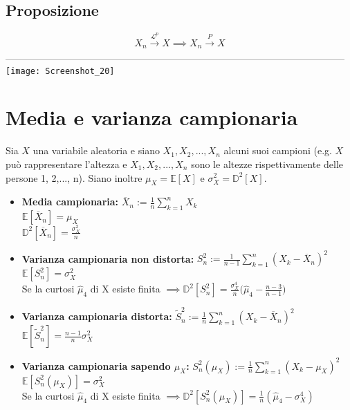 \documentclass{article}
\begin{document}
\subsection*{Proposizione}
\[ X_{n} \xrightarrow[]{\mathcal{L}^{p}}X \implies X_{n} \xrightarrow[]{P}X \]
---------------------------------------------------------------------------------------------------------\\
\texttt{[image: Screenshot\_20]}

\section*{Media e varianza campionaria}
Sia $X$ una variabile aleatoria e siano $X_{1}, X_{2},...,X_{n}$ alcuni suoi campioni (e.g. $X$ può rappresentare l'altezza e $X_{1}, X_{2},...,X_{n}$ sono le altezze rispettivamente delle persone 1, 2,..., n). Siano inoltre $\mu_{X} = \mathbb{E}[X]$ e $\sigma_{X}^{2} = \mathbb{D}^{2}[X]$.
\begin{itemize}
\item \textbf{Media campionaria:} $\overline{X}_{n} := \frac{1}{n} \sum_{k=1}^{n}X_{k}$\\
$\mathbb{E}[\overline{X}_{n}] = \mu_{X}$\\
$\mathbb{D}^{2}[\overline{X}_{n}] = \frac{\sigma_{X}^{2}}{n}$
\item \textbf{Varianza campionaria non distorta:} $S_{n}^{2} := \frac{1}{n-1} \sum_{k=1}^{n}(X_{k} - \overline{X}_{n})^{2}$\\
$\mathbb{E}[S_{n}^{2}] = \sigma_{X}^{2}$\\
Se la curtosi $\hat{\mu}_{4}$ di X esiste finita $\implies \mathbb{D}^{2}[S_{n}^{2}] = \frac{\sigma_{X}^{4}}{n}\Big(\hat{\mu}_{4}-\frac{n-3}{n-1}\Big)$
\item \textbf{Varianza campionaria distorta:} $\widetilde{S}_{n}^{2} := \frac{1}{n} \sum_{k=1}^{n}(X_{k} - \overline{X}_{n})^{2}$\\
$\mathbb{E}[\widetilde{S}_{n}^{2}] = \frac{n-1}{n} \sigma_{X}^{2}$
\item \textbf{Varianza campionaria sapendo $\mu_{X}$:} $S_{n}^{2}(\mu_{X}) := \frac{1}{n} \sum_{k=1}^{n}(X_{k} - \mu_{X})^{2}$\\
$\mathbb{E}[S_{n}^{2}(\mu_{X})] = \sigma_{X}^{2}$\\
Se la curtosi $\hat{\mu}_{4}$ di X esiste finita $\implies \mathbb{D}^{2}[S_{n}^{2}(\mu_{X})] = \frac{1}{n}(\hat{\mu}_{4} - \sigma_{X}^{4})$
\end{itemize}
\end{document}
